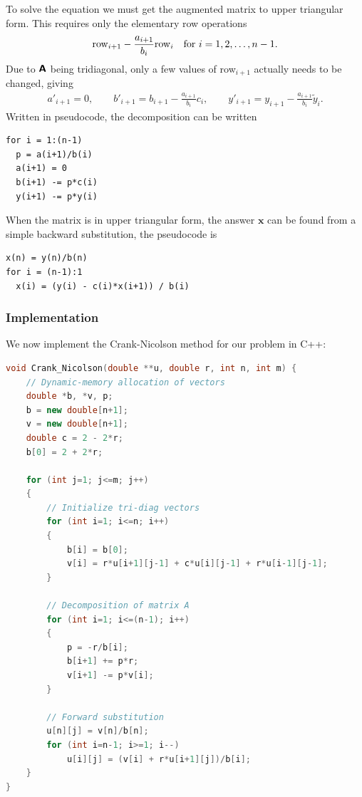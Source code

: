 \documentclass[a4paper, 11pt, notitlepage, english]{article}
\newcommand{\bt}[1]{\boldsymbol{#1}}
\newcommand{\mat}[1]{\textsf{\textbf{#1}}}
\begin{document}
To solve the equation we must get the augmented matrix to upper triangular form. This requires only the elementary row operations 
$${\rm row}_{i+1} - \frac{a_{i+1}}{b_i}{\rm row}_i \quad {\rm for} \ i=1,2,\dots,n-1.$$
Due to $\mat{A}$ being tridiagonal, only a few values of row$_{i+1}$ actually needs to be changed, giving
\begin{align*}
a'_{i+1} = 0, \qquad b'_{i+1} = b_{i+1} - \frac{a_{i+1}}{b_i} c_i, \qquad y'_{i+1} = y_{i+1} - \frac{a_{i+1}}{b_i} \tilde{y}_{i}.
\end{align*}
Written in pseudocode, the decomposition can be written
\begin{lstlisting}[frame=single]
for i = 1:(n-1)
  p = a(i+1)/b(i)
  a(i+1) = 0
  b(i+1) -= p*c(i)
  y(i+1) -= p*y(i)
\end{lstlisting}
When the matrix is in upper triangular form, the answer $\bt{x}$ can be found from a simple backward substitution, the pseudocode is
\begin{lstlisting}
x(n) = y(n)/b(n)
for i = (n-1):1
  x(i) = (y(i) - c(i)*x(i+1)) / b(i) 
\end{lstlisting}

\subsubsection*{Implementation}
We now implement the Crank-Nicolson method for our problem in C++:
\begin{lstlisting}[language=c++]
void Crank_Nicolson(double **u, double r, int n, int m) {
    // Dynamic-memory allocation of vectors
    double *b, *v, p;
    b = new double[n+1];
    v = new double[n+1];
    double c = 2 - 2*r;
    b[0] = 2 + 2*r;

    for (int j=1; j<=m; j++)
    {
        // Initialize tri-diag vectors
        for (int i=1; i<=n; i++)
        {
            b[i] = b[0];
            v[i] = r*u[i+1][j-1] + c*u[i][j-1] + r*u[i-1][j-1];
        }   

        // Decomposition of matrix A
        for (int i=1; i<=(n-1); i++)
        {
            p = -r/b[i];    
            b[i+1] += p*r;
            v[i+1] -= p*v[i];
        }

        // Forward substitution
        u[n][j] = v[n]/b[n];
        for (int i=n-1; i>=1; i--)
            u[i][j] = (v[i] + r*u[i+1][j])/b[i];
    }
}
\end{lstlisting}
\end{document}
